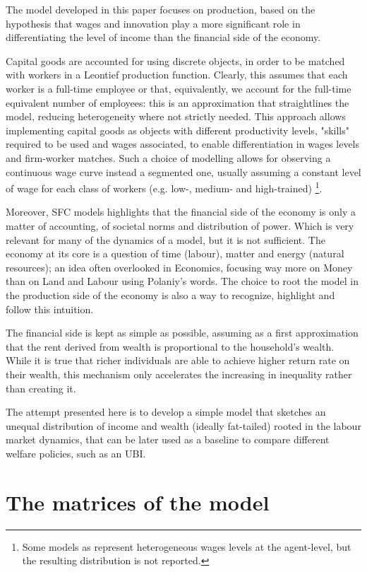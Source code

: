 \documentclass[]{article}
\begin{document}
The model developed in this paper focuses on production, based on the hypothesis that wages and innovation play a more significant role in differentiating the level of income than the financial side of the economy.

Capital goods are accounted for using discrete objects, in order to be matched with workers in a Leontief production function.
Clearly, this assumes that each worker is a full-time employee or that, equivalently, we account for the full-time equivalent number of employees: this is an approximation that straightlines the model, reducing heterogeneity where not strictly needed. 
This approach allows implementing capital goods as objects with different productivity levels, "skills" required to be used and wages associated, to enable differentiation in wages levels and firm-worker matches.
Such a choice of modelling allows for observing a continuous wage curve instead a segmented one, usually assuming a constant level of wage for each class of workers (e.g. low-, medium- and high-trained) \parencite{caiani2019b}\footnote{Some models as \textcite{dosi2021a} represent heterogeneous wages levels at the agent-level, but the resulting distribution is not reported.}.

Moreover, SFC models highlights that the financial side of the economy is only a matter of accounting, of societal norms and distribution of power.
Which is very relevant for many of the dynamics of a model, but it is not sufficient.
The economy at its core is a question of time (labour), matter and energy (natural resources); an idea often overlooked in Economics, focusing way more on Money than on Land and Labour using Polaniy's words.
The choice to root the model in the production side of the economy is also a way to recognize, highlight and follow this intuition.

The financial side is kept as simple as possible, assuming as a first approximation that the rent derived from wealth is proportional to the household's wealth.
While it is true that richer individuals are able to achieve higher return rate on their wealth, this mechanism only accelerates the increasing in inequality rather than creating it.

The attempt presented here is to develop a simple model that sketches an unequal distribution of income and wealth (ideally fat-tailed) rooted in the labour market dynamics, that can be later used as a baseline to compare different welfare policies, such as an UBI.

\section{The matrices of the model}
\end{document}

